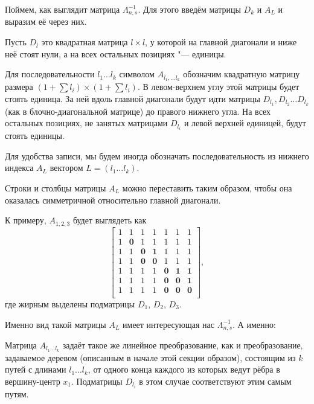 \documentclass[a4paper, 14pt]{extarticle}
\begin{document}
Поймем, как выглядит матрица $\Lambda_{n, s}^{-1}$. Для этого введём матрицы
$D_k$ и $A_L$ и выразим её через них.

Пусть $D_l$ это квадратная матрица $l \times l$, у которой на главной диагонали и
ниже неё стоят нули, а на всех остальных позициях "--- единицы.

\begin{definition}
Для последовательности $l_1 \dots l_k$ символом $A_{l_1, \dots l_k}$ обозначим
квадратную матрицу размера $(1 + \sum l_i) \times (1 + \sum l_i)$. В левом-верхнем
углу этой матрицы будет стоять единица. За ней вдоль главной диагонали будут идти
матрицы $D_{l_1}, D_{l_2} \dots D_{l_k}$ (как в блочно-диагональной матрице) до
правого нижнего угла. На всех остальных позициях, не занятых матрицами $D_{l_i}$
и левой верхней единицей, будут стоять единицы.
\end{definition}

Для удобства записи, мы будем иногда обозначать последовательность из нижнего
индекса $A_L$ вектором $L = (l_1 \dots l_k)$.

\begin{remark}
Строки и столбцы матрицы $A_L$ можно переставить таким образом, чтобы она
оказалась симметричной относительно главной диагонали.
\end{remark}

К примеру, $A_{1, 2, 3}$ будет выглядеть как
\[
\begin{bmatrix}
1 & 1 & 1 & 1 & 1 & 1 & 1 \\
1 & \mathbf{0} & 1 & 1 & 1 & 1 & 1 \\
1 & 1 & \mathbf{0} & \mathbf{1} & 1 & 1 & 1 \\
1 & 1 & \mathbf{0} & \mathbf{0} & 1 & 1 & 1 \\
1 & 1 & 1 & 1 & \mathbf{0} & \mathbf{1} & \mathbf{1} \\
1 & 1 & 1 & 1 & \mathbf{0} & \mathbf{0} & \mathbf{1} \\
1 & 1 & 1 & 1 & \mathbf{0} & \mathbf{0} & \mathbf{0} \\
\end{bmatrix},
\]
где жирным выделены подматрицы $D_1$, $D_2$, $D_3$.

Именно вид такой матрицы $A_L$ имеет интересующая нас $\Lambda_{n, s}^{-1}$. А
именно:

\begin{remark}
Матрица $A_{l_1 \dots l_k}$ задаёт такое же линейное преобразование, как и
преобразование, задаваемое деревом (описанным в начале этой секции образом),
состоящим из $k$ путей с длинами $l_1 \dots l_k$, от одного конца каждого из
которых ведут рёбра в вершину-центр $x_1$. Подматрицы $D_{l_i}$ в этом случае
соответствуют этим самым путям.
\end{remark}
\end{document}
